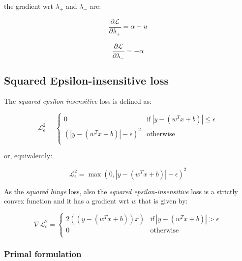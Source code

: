 the gradient wrt $\lambda_+$ and $\lambda_-$ are:

\begin{equation} \label{eq:svr_bcqp_lagrangian_der_lp}
	\frac{\partial \mathcal{L}}{\partial \lambda_+}=\alpha - u
\end{equation}

\begin{equation} \label{eq:svr_bcqp_lagrangian_der_lm}
    \frac{\partial \mathcal{L}}{\partial \lambda_-}=-\alpha
\end{equation}

\pagebreak

\subsection{Squared Epsilon-insensitive loss}

The \emph{squared epsilon-insensitive} loss is defined as:

\begin{equation} \label{eq:squared_eps_loss1}
	\mathcal{L}_\epsilon^2 = 
	\begin{cases}
		0 & \text{if} \ |y - (w^T x + b)| \leq \epsilon \\
		(|y - (w^T x + b)| - \epsilon)^2 & \text{otherwise} \\
	\end{cases}
\end{equation}

or, equivalently:

\begin{equation} \label{eq:squared_eps_loss2}
	\mathcal{L}_\epsilon^2 = \max(0, |y - (w^T x + b)| - \epsilon)^2
\end{equation}

As the \emph{squared hinge} loss, also the \emph{squared epsilon-insensitive} loss is a strictly convex function and it has a gradient wrt $w$ that is given by:

\begin{equation} \label{eq:squared_eps_loss_der}
	\nabla \mathcal{L}_\epsilon^2=
		\begin{cases}
            2 ((y - (w^T x + b)) x) & \text{if} \ |y - (w^T x + b)| > \epsilon \\
            0 & \text{otherwise} \\ 
        \end{cases}
\end{equation}

\subsubsection{Primal formulation}

